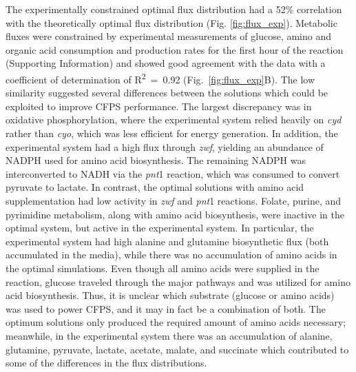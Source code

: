 \documentclass[journal=asbcd6,manuscript=article]{achemso}
\begin{document}
The experimentally constrained optimal flux distribution had a 52\% correlation with the theoretically optimal flux distribution (Fig. \ref{fig:flux_exp}).
Metabolic fluxes were constrained by experimental measurements of glucose, amino and organic acid consumption and production rates for the first hour of the reaction (Supporting Information) and showed good agreement with the data with a coefficient of determination of R\textsuperscript{2}~=~0.92 (Fig.~\ref{fig:flux_exp}B).
The low similarity suggested several differences between the solutions which could be exploited to improve CFPS performance.
The largest discrepancy was in oxidative phosphorylation, where the experimental system relied heavily on \textit{cyd} rather than \textit{cyo}, which was less efficient for energy generation.
In addition, the experimental system had a high flux through \textit{zwf}, yielding an abundance of NADPH used for amino acid biosynthesis.
The remaining NADPH was interconverted to NADH via the \textit{pnt}1 reaction, which was consumed to convert pyruvate to lactate.
In contrast, the optimal solutions with amino acid supplementation had low activity in \textit{zwf} and \textit{pnt}1 reactions.
Folate, purine, and pyrimidine metabolism, along with amino acid biosynthesis, were inactive in the optimal system, but active in the experimental system.
In particular, the experimental system had high alanine and glutamine biosynthetic flux (both accumulated in the media), while there was no accumulation of amino acids in the optimal simulations.
Even though all amino acids were supplied in the reaction, glucose traveled through the major pathways and was utilized for amino acid biosynthesis.
Thus, it is unclear which substrate (glucose or amino acids) was used to power CFPS, and it may in fact be a combination of both.
The optimum solutions only produced the required amount of amino acids necessary; meanwhile, in the experimental system there was an accumulation of alanine, glutamine, pyruvate, lactate, acetate, malate, and succinate which contributed to some of the differences in the flux distributions. %
\end{document}

